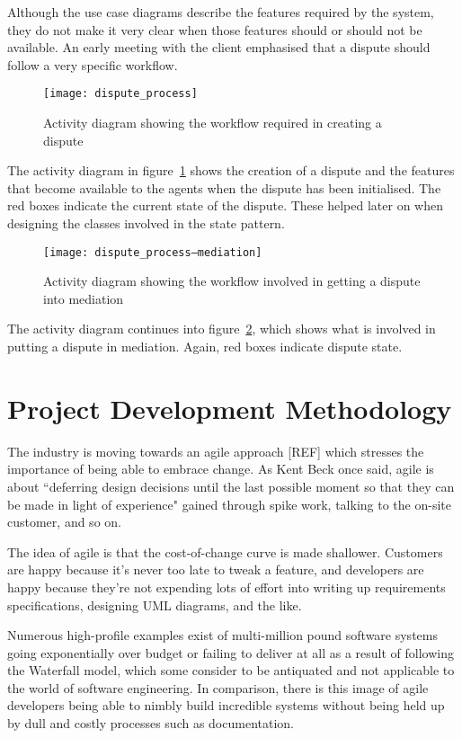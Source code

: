 Although the use case diagrams describe the features required by the system, they do not make it very clear when those features should or should not be available. An early meeting with the client emphasised that a dispute should follow a very specific workflow.

\begin{figure}[h!]
  \centering
    \ifimages
    \texttt{[image: dispute\_process]}
    \fi
  \caption{Activity diagram showing the workflow required in creating a dispute}
  \label{uml:activity:dispute}
\end{figure}

The activity diagram in figure~\ref{uml:activity:dispute} shows the creation of a dispute and the features that become available to the agents when the dispute has been initialised. The red boxes indicate the current state of the dispute. These helped later on when designing the classes involved in the state pattern.

\begin{figure}[h!]
  \centering
    \ifimages
    \texttt{[image: dispute\_process--mediation]}
    \fi
  \caption{Activity diagram showing the workflow involved in getting a dispute into mediation}
  \label{uml:activity:mediation}
\end{figure}

The activity diagram continues into figure~\ref{uml:activity:mediation}, which shows what is involved in putting a dispute in mediation. Again, red boxes indicate dispute state.

\section{Project Development Methodology}

The industry is moving towards an agile approach [REF] which stresses the importance of being able to embrace change. As Kent Beck once said, agile is about ``deferring design decisions until the last possible moment so that they can be made in light of experience" gained through spike work, talking to the on-site customer, and so on.

The idea of agile is that the cost-of-change curve is made shallower. Customers are happy because it's never too late to tweak a feature, and developers are happy because they're not expending lots of effort into writing up requirements specifications, designing UML diagrams, and the like.

Numerous high-profile examples exist of multi-million pound software systems going exponentially over budget or failing to deliver at all as a result of following the Waterfall model, which some consider to be antiquated and not applicable to the world of software engineering. In comparison, there is this image of agile developers being able to nimbly build incredible systems without being held up by dull and costly processes such as documentation.

